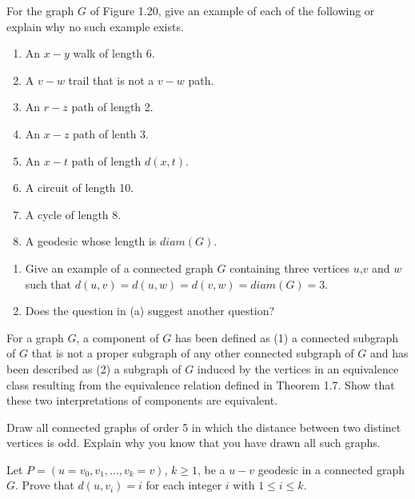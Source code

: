 \begin{exer}
For the graph $G$ of Figure 1.20, give an example of each of the following or explain why no such example exists.
\begin{enumerate}[{(a)}]
\item An $x-y$ walk of length 6.
\item A $v-w$ trail that is not a $v-w$ path.
\item An $r-z$ path of length 2.
\item An $x-z$ path of lenth 3.
\item An $x-t$ path of length $d(x,t)$.
\item A circuit of length 10.
\item A cycle of length 8.
\item A geodesic whose length is $diam(G)$.
\end{enumerate}
\end{exer}

\begin{exer}
\begin{enumerate}[{(a)}]
\item Give an example of a connected graph $G$ containing three vertices $u$,$v$ and $w$ such that $d(u,v)=d(u,w)=d(v,w)=diam(G)=3$.
\item Does the question in (a) suggest another question?
\end{enumerate}
\end{exer}

\begin{exer}
For a graph $G$, a component of $G$ has been defined as (1) a connected subgraph of $G$ that is not a proper subgraph of any other connected subgraph of $G$ and has been described as (2) a subgraph of $G$ induced by the vertices in an equivalence class resulting from the equivalence relation defined in Theorem 1.7. Show that these two interpretations of components are equivalent.
\end{exer}

\begin{exer}
Draw all connected graphs of order 5 in which the distance between two distinct vertices is odd. Explain why you know that you have drawn all such graphs.
\end{exer}

\begin{exer}
Let $P = (u = v_{0},v_{1},\ldots,v_{k} = v)$, $k \geq 1$, be a $u-v$ geodesic in a connected graph $G$. Prove that $d(u,v_{i}) = i$ for each integer $i$ with $1 \leq i \leq k$.
\end{exer}

